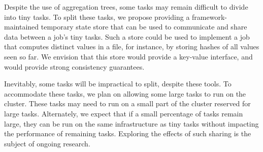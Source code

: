 

Despite the use of aggregation trees, some tasks may remain
difficult to divide into tiny tasks. 
To split these tasks, we propose providing a framework-maintained
temporary state store that can be used to communicate and share data between a
job's tiny tasks. Such a store could be used to implement a job that computes
distinct values in a file, for instance, by storing hashes of all values
seen so far. We envision that this store would provide a key-value interface,
and would provide strong consistency guarantees.

Inevitably, some tasks will be impractical to split, despite these tools.
To accommodate these
tasks, we plan on allowing some large tasks to run on the cluster. These tasks
may need to run on a small part of the cluster reserved for large tasks.
Alternately, we expect that if a small percentage of tasks remain large, they
can be run on the same infrastructure as tiny tasks without impacting the
performance of remaining tasks. Exploring the effects of such sharing is
the subject of ongoing research.
